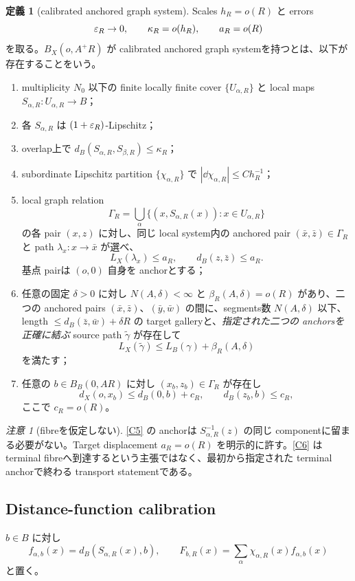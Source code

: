 \documentclass[11pt,a4paper]{ltjsarticle}
\theoremstyle{plain}
\theoremstyle{definition}
\newtheorem{definition}[theorem]{定義}\newtheorem{hypothesis}[theorem]{仮定}
\theoremstyle{remark}
\newtheorem{remark}[theorem]{注意}\newtheorem{warning}[theorem]{警告}
\begin{document}
\begin{definition}[calibrated anchored graph system]\label{def:calibrated-system}
Scales $h_R=o(R)$ と errors
\[
 \varepsilon_R\to0,\qquad \kappa_R=o(h_R),\qquad a_R=o(R)
\]
を取る。$B_X(o,A^+R)$ が calibrated anchored graph systemを持つとは、以下が存在することをいう。
\begin{enumerate}[label=(C\arabic*)]
 \item\label{C1} multiplicity $N_0$ 以下の finite locally finite cover $\{U_{\alpha,R}\}$ と local maps $S_{\alpha,R}:U_{\alpha,R}\to B$；
 \item\label{C2} 各 $S_{\alpha,R}$ は $(1+\varepsilon_R)$-Lipschitz；
 \item\label{C3} overlap上で $d_B(S_{\alpha,R},S_{\beta,R})\le\kappa_R$；
 \item\label{C4} subordinate Lipschitz partition $\{\chi_{\alpha,R}\}$ で $|\dd\chi_{\alpha,R}|\le Ch_R^{-1}$；
 \item\label{C5} local graph relation
 \[
  \Gamma_R=\bigcup_\alpha\{(x,S_{\alpha,R}(x)):x\in U_{\alpha,R}\}
 \]
 の各 pair $(x,z)$ に対し、同じ local system内の anchored pair $(\bar x,\bar z)\in\Gamma_R$ と path $\lambda_x:x\to\bar x$ が選べ、
 \[
  L_X(\lambda_x)\le a_R,\qquad d_B(z,\bar z)\le a_R.
 \]
 基点 pairは $(o,0)$ 自身を anchorとする；
 \item\label{C6} 任意の固定 $\delta>0$ に対し $N(A,\delta)<\infty$ と $\beta_R(A,\delta)=o(R)$ があり、二つの anchored pairs $(\bar x,\bar z)$、$(\bar y,\bar w)$ の間に、segments数 $N(A,\delta)$ 以下、length $\le d_B(\bar z,\bar w)+\delta R$ の target galleryと、\emph{指定された二つの anchorsを正確に結ぶ} source path $\widetilde\gamma$ が存在して
 \[
  L_X(\widetilde\gamma)\le L_B(\gamma)+\beta_R(A,\delta)
 \]
 を満たす；
 \item\label{C7} 任意の $b\in B_B(0,AR)$ に対し $(x_b,z_b)\in\Gamma_R$ が存在し
 \[
  d_X(o,x_b)\le d_B(0,b)+c_R,\qquad d_B(z_b,b)\le c_R,
 \]
 ここで $c_R=o(R)$。
\end{enumerate}
\end{definition}

\begin{remark}[fibreを仮定しない]
\ref{C5} の anchorは $S_{\alpha,R}^{-1}(z)$ の同じ componentに留まる必要がない。Target displacement $a_R=o(R)$ を明示的に許す。\ref{C6} は terminal fibreへ到達するという主張ではなく、最初から指定された terminal anchorで終わる transport statementである。
\end{remark}

\subsection{Distance-function calibration}
$b\in B$ に対し
\[
 f_{\alpha,b}(x)=d_B(S_{\alpha,R}(x),b),\qquad
 F_{b,R}(x)=\sum_\alpha\chi_{\alpha,R}(x)f_{\alpha,b}(x)
\]
と置く。
\end{document}
